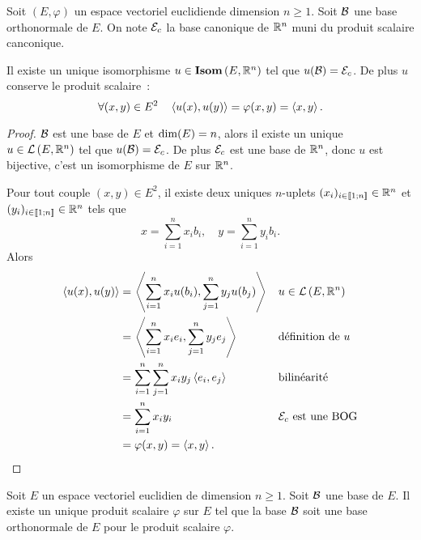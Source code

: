     \begin{theo}
      Soit \((E,\varphi)\) un espace vectoriel euclidiende dimension \(n \geqslant 1\). Soit \(\mathcal{B}\) une base orthonormale de \(E\). On note \(\mathcal{E}_c\) la base canonique de \(\mathbb{R}^n\) muni du produit scalaire canconique.

      Il existe un unique isomorphisme \(u \in \mathbf{Isom}\left(E,\mathbb{R}^n\right)\) tel que \(u(\mathcal{B})=\mathcal{E}_c\). De plus \(u\) conserve le produit scalaire~:
      \begin{equation}
        \forall (x,y) \in E^2 \quad \left\langle{u(x)},{u(y)}\right\rangle=\varphi(x,y)=\left\langle{x},{y}\right\rangle.
      \end{equation}
    \end{theo}
    \begin{proof}
      \(\mathcal{B}\) est une base de \(E\) et \(\operatorname{dim}(E)=n\), alors il existe un unique \(u \in \mathcal{L}\left(E,\mathbb{R}^n\right)\) tel que \(u(\mathcal{B})=\mathcal{E}_c\). De plus \(\mathcal{E}_c\) est une base de \(\mathbb{R}^n\), donc \(u\) est bijective, c'est un isomorphisme de \(E\) sur \(\mathbb{R}^n\).

      Pour tout couple \((x,y) \in E^2\), il existe deux uniques \(n\)-uplets \((x_i)_{i \in \mathopen{\llbracket}1\mathclose{}\mathpunct{};n\mathclose{\rrbracket}}\in \mathbb{R}^n\) et \((y_i)_{i \in \mathopen{\llbracket}1\mathclose{}\mathpunct{};n\mathclose{\rrbracket}}\in \mathbb{R}^n\) tels que
      \begin{equation}
        x = \sum_{i=1}^n x_i b_i, \quad y = \sum_{i=1}^n y_i b_i.
      \end{equation}
      Alors
      \begin{align}
        \left\langle{u(x)},{u(y)}\right\rangle &=\left\langle{\sum_{i=1}^n x_i u(b_i)},{\sum_{j=1}^n y_j u(b_j)}\right\rangle && u \in \mathcal{L}\left(E,\mathbb{R}^n\right) \\
                              &=\left\langle{\sum_{i=1}^n x_i e_i},{\sum_{j=1}^n y_j e_j}\right\rangle && \text{définition de } u\\
                              &=\sum_{i=1}^n \sum_{j=1}^n x_iy_j \left\langle{e_i},{e_j}\right\rangle && \text{bilinéarité} \\
                              &=\sum_{i=1}^n x_i y_i && \mathcal{E}_c \text{~est une  BOG} \\
                              &=\varphi(x,y)=\left\langle{x},{y}\right\rangle.
      \end{align}
    \end{proof}
    \begin{theo}
      Soit \(E\) un espace vectoriel euclidien de dimension \(n \geqslant 1\). Soit \(\mathcal{B}\) une base de \(E\). Il existe un unique produit scalaire \(\varphi\) sur \(E\) tel que la base \(\mathcal{B}\) soit une base orthonormale de \(E\) pour le produit scalaire \(\varphi\).
    \end{theo}
